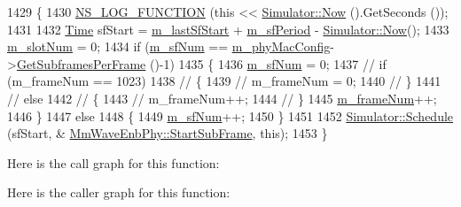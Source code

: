 \begin{DoxyCode}
1429 \{
1430         \hyperlink{log-macros-disabled_8h_a90b90d5bad1f39cb1b64923ea94c0761}{NS\_LOG\_FUNCTION} (\textcolor{keyword}{this} << \hyperlink{classns3_1_1Simulator_ac3178fa975b419f7875e7105be122800}{Simulator::Now} ().GetSeconds ());
1431 
1432         \hyperlink{namespacens3_1_1TracedValueCallback_a7ffd3e7c142ffe7c8a1d2db9b8de38ec}{Time} sfStart = \hyperlink{classns3_1_1MmWaveEnbPhy_aa928d54402d87640ee61f0c3b5cf2e0c}{m\_lastSfStart} + \hyperlink{classns3_1_1MmWaveEnbPhy_a164bffc51f5edf0109f976a874bd3123}{m\_sfPeriod} - 
      \hyperlink{classns3_1_1Simulator_ac3178fa975b419f7875e7105be122800}{Simulator::Now}();
1433         \hyperlink{classns3_1_1MmWavePhy_a6c83cdb8c36a9a58ae8b9f17933680ac}{m\_slotNum} = 0;
1434         \textcolor{keywordflow}{if} (\hyperlink{classns3_1_1MmWavePhy_af3d76eb9f3e5e1ff669852d05986c1a3}{m\_sfNum} == \hyperlink{classns3_1_1MmWavePhy_a869abf36bbdbb94eed77ba6e4846f6e4}{m\_phyMacConfig}->\hyperlink{classns3_1_1MmWavePhyMacCommon_a3709cf52f6813eb8ad1af16d95082dc1}{GetSubframesPerFrame} ()-1)
1435         \{
1436                 \hyperlink{classns3_1_1MmWavePhy_af3d76eb9f3e5e1ff669852d05986c1a3}{m\_sfNum} = 0;
1437 \textcolor{comment}{//              if (m\_frameNum == 1023)}
1438 \textcolor{comment}{//              \{}
1439 \textcolor{comment}{//                      m\_frameNum = 0;}
1440 \textcolor{comment}{//              \}}
1441 \textcolor{comment}{//              else}
1442 \textcolor{comment}{//              \{}
1443 \textcolor{comment}{//                      m\_frameNum++;}
1444 \textcolor{comment}{//              \}}
1445                 \hyperlink{classns3_1_1MmWavePhy_a852ce585035a1c12122d2775e64ff38a}{m\_frameNum}++;
1446         \}
1447         \textcolor{keywordflow}{else}
1448         \{
1449                 \hyperlink{classns3_1_1MmWavePhy_af3d76eb9f3e5e1ff669852d05986c1a3}{m\_sfNum}++;
1450         \}
1451 
1452         \hyperlink{classns3_1_1Simulator_a671882c894a08af4a5e91181bf1eec13}{Simulator::Schedule} (sfStart, &
      \hyperlink{classns3_1_1MmWaveEnbPhy_af066571ea81c9b07cb94f84e5297c11d}{MmWaveEnbPhy::StartSubFrame}, \textcolor{keyword}{this});
1453 \}
\end{DoxyCode}


Here is the call graph for this function\+:




Here is the caller graph for this function\+:



